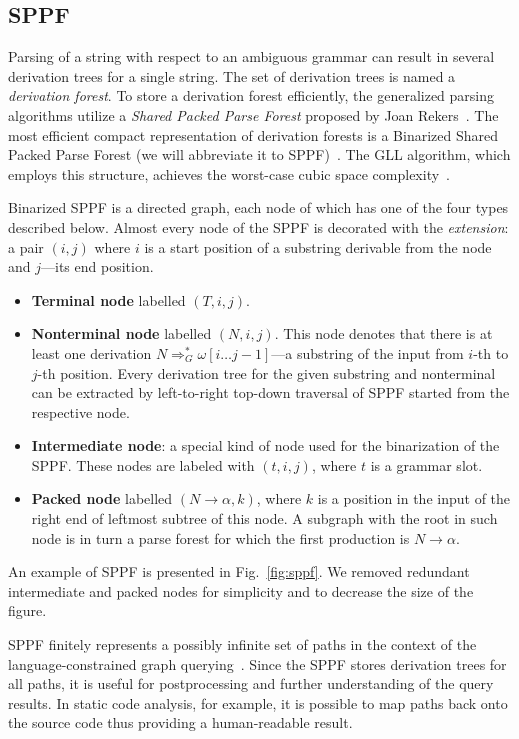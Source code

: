 \subsection{SPPF}

Parsing of a string with respect to an ambiguous grammar can result in several derivation trees for a single string.
The set of derivation trees is named a \emph{derivation forest}.
To store a derivation forest efficiently, the generalized parsing algorithms utilize a \emph{Shared Packed Parse Forest} proposed by Joan Rekers~\cite{SPPF}.
The most efficient compact representation of derivation forests is a Binarized Shared Packed Parse Forest (we will abbreviate it to SPPF)~\cite{brnglr}.
The GLL algorithm, which employs this structure, achieves the worst-case cubic space complexity~\cite{gllParsingTree}.

Binarized SPPF is a directed graph, each node of which has one of the four types described below.
Almost every node of the SPPF is decorated with the \emph{extension}: a pair $(i, j)$ where $i$ is a start position of a substring derivable from the node and $j$---its end position.

\begin{itemize}
    \item \textbf{Terminal node} labelled $(T, i, j)$.
    \item \textbf{Nonterminal node} labelled $(N, i, j)$.
    This node denotes that there is at least one derivation $N \Rightarrow^*_G \omega[i \dots j-1]$---a substring of the input from $i$-th to $j$-th position.
    Every derivation tree for the given substring and nonterminal can be extracted by left-to-right top-down traversal of SPPF started from the respective node.
    \item \textbf{Intermediate node}: a special kind of node used for the binarization of the SPPF. These nodes are labeled with $(t,i,j)$, where $t$ is a grammar slot.
    \item \textbf{Packed node} labelled $(N \rightarrow \alpha, k)$, where $k$ is a position in the input of the right end of leftmost subtree of this node.
    A subgraph with the root in such node is in turn a parse forest for which the first production is $N \rightarrow \alpha$.
\end{itemize}


An example of SPPF is presented in Fig.~\ref{fig:sppf}.
We removed redundant intermediate and packed nodes for simplicity and to decrease the size of the figure.

SPPF finitely represents a possibly infinite set of paths in the context of the language-constrained graph querying~\cite{GrigorevR16}.
Since the SPPF stores derivation trees for all paths, it is useful for postprocessing and further understanding of the query results.
In static code analysis, for example, it is possible to map paths back onto the source code thus providing a human-readable result.